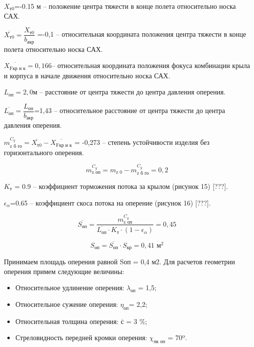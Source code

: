 $X_\text{т0}$=-0.15 м – положение центра тяжести в конце полета относительно носка САХ.

$\overline{X_\text{т0}} = \dfrac{X_\text{т0}}{b_\text{акр}} $ =-0,1 – относительная координата положения центра тяжести в конце полета относительно носка САХ.

$\overline{ X_\text{Fкр и к} }=0,166 $– относительная координата положения фокуса комбинации крыла и корпуса в начале движения относительно носка САХ.

$L_\text{оп}=2,0$м – расстояние от центра тяжести до центра давления оперения.

$\overline{L_\text{оп}} = \dfrac{L_\text{оп}}{b_\text{акр}} $=1,43 – относительное расстояние от центра тяжести до центра давления оперения.

$m_\text{z б го}^{C_y} = \overline{X_\text{т0}} - \overline{X_\text{Fкр и к} } $ = -0,273 – степень устойчивости изделия без горизонтального оперения.

$$m_\text{z оп}^{C_y}=m_\text{z 0} - m_\text{z б го} ^{C_y} =0,2$$

$K_\text{т}$ = 0.9 – коэффициент торможения потока за крылом (рисунок 15) [???].

$\epsilon_\alpha $=0.65 – коэффициент скоса потока на оперение (рисунок 16) [???].

$$\overline{S_\text{оп}} = \dfrac{ m_\text{z оп}^{C_y} } { \overline{L_\text{оп}} \cdot K_\text{т} \cdot ( 1-\epsilon_\alpha) } =0,45$$

$$S_\text{оп}= \overline{S_\text{оп}} \cdot S_\text{кр}  = 0,41 \text{ м}^2$$


Принимаем площадь оперения равной Sоп = 0,4 м2. Для расчетов геометрии оперения примем следующие величины:
\begin{itemize}
 \item Относительное удлинение оперения:			$\lambda_\text{оп}$ = 1,5;
 \item Относительное сужение оперения:				$\eta_\text{оп} $= 2,2;
 \item Относительная толщина оперения:				$\overline{с} $ = 3 \%;
 \item Стреловидность передней кромки оперения:		$\chi_\text{пк оп} $ = 70º.
\end{itemize}


